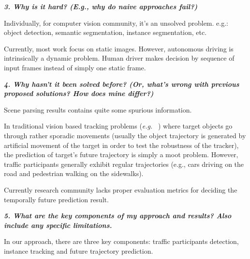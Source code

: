 \documentclass[10pt,twocolumn,letterpaper]{article}
\begin{document}
\textbf{\emph{3. Why is it hard? (E.g., why do naive approaches fail?)}}

Individually, for computer vision community, it's an unsolved problem. e.g.: object detection, semantic segmentation, instance segmentation, etc.


Currently, most work focus on static images. However, autonomous driving is intrinsically a dynamic problem. Human driver makes decision by sequence of input frames instead of simply one static frame.

\textbf{\emph{4. Why hasn't it been solved before? (Or, what's wrong with previous proposed solutions? How does mine differ?)}}

Scene parsing results contains quite some spurious information.

In traditional vision based tracking problems (\emph{e.g.} ~\cite{wu2013online, wu2015object, mueller2016benchmark}) where target objects go through rather sporadic movements (usually the object trajectory is generated by artificial movement of the target in order to test the robustness of the tracker), the prediction of target's future trajectory is simply a moot problem.
However, traffic participants generally exhibit regular trajectories (e.g., cars driving on the road and pedestrian walking on the sidewalks).

Currently research community lacks proper evaluation metrics for deciding the temporally future prediction result.



\textbf{\emph{5. What are the key components of my approach and results? Also include any specific limitations.}}

In our approach, there are three key components: traffic participants detection, instance tracking and future trajectory prediction.

\end{document}
